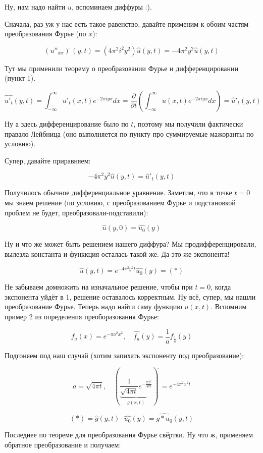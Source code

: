 \documentclass{article}
\begin{document}
Ну, нам надо найти $u$, вспоминаем диффуры :).

Сначала, раз уж у нас есть такое равенство, давайте применим к обоим частям преобразования Фурье (по $x$):

\[(u''_{xx})^{\hat{\,}}(y, t) = (4 \pi^2 i^2 y^2)\hat{u}(y, t) = - 4 \pi^2 y^2 \hat{u}(y, t)\]

Тут мы применили теорему о преобразовании Фурье и дифференцировании (пункт 1).

\[\hat{u'_t}(y, t) = \int_{-\infty}^{\infty} u'_t(x, t)e^{-2\pi i yx} dx = \frac{\partial}{\partial t} \left(\int_{-\infty}^{\infty} u(x, t)e^{-2\pi i yx} dx \right) = \hat{u}'_t(y, t)\]

Ну а здесь дифференцирование было по $t$, поэтому мы получили фактически правало Лейбница (оно выполняется по пункту про суммируемые мажоранты по условию).

Супер, давайте приравняем:

\[- 4 \pi^2 y^2 \hat{u}(y, t) = \hat{u}'_t(y, t)\]

Получилось обычное дифференциальное уравнение. Заметим, что в точке $t = 0$ мы знаем решение (по условию, с преобразованием Фурье и подстановкой проблем не будет, преобразовали-подставили):

\[\hat{u}(y, 0) = \widehat{u_0}(y)\]

Ну и что же может быть решением нашего диффура? Мы продифференцировали, вылезла константа и функкция осталась такой же. Да это же экспонента!

\[\hat{u}(y, t) = e^{-4\pi^2 y^2 t}\hat{u_0}(y) = (*)\]

Не забываем домножить на изначальное решение, чтобы при $t = 0$, когда экспонента уйдёт в 1, решение оставалось корректным. Ну всё, супер, мы нашли преобразование Фурье. Теперь надо найти саму функцию $u(x, t)$. Вспомним пример 2 из определения преоборазования Фурье:

\[f_a(x) = e^{-\pi a^2x^2}, \quad \widehat{f_a}(y) = \frac{1}{a}f_{\frac{1}{a}}(y)\]

Подгоняем под наш случай (хотим запихать экспоненту под преобразование):

\[a = \sqrt{4 \pi t}, \quad \left(\underbrace{\frac{1}{\sqrt{4 \pi t}} e^{-\frac{\pi x^2}{4 \pi t}}}_{g(x, t)}\right)^{\hat{\,}} = e^{-4\pi^2 x^2 t}\]

\[(*) = \hat{g}(y, t) \cdot \widehat{u_0}(y) = \widehat{g * u_0}(y, t)\]

Последнее по теореме для преобразования Фурье свёртки. Ну что ж, применяем обратное преобразование и получаем:
\end{document}
